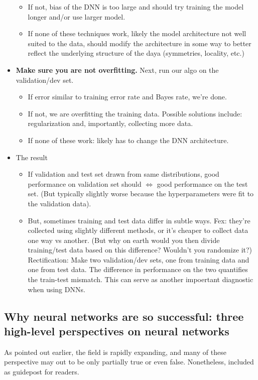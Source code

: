 \documentclass[norsk,a4paper,11pt]{article}
\begin{document}
\begin{itemize}
\begin{itemize}
		\item If not, bias of the DNN is too large and should try training the model longer and/or use larger model.
		\item If none of these techniques work, likely the model architecture not well suited to the data, should modify the architecture in some way to better reflect the underlying structure of the daya (symmetries, locality, etc.)
	\end{itemize}
	\item \textbf{Make sure you are not overfitting.}
	Next, run our algo on the validation/dev set.
	\begin{itemize}
		\item If error similar to training error rate and Bayes rate, we're done.
		\item If not, we are overfitting the training data. Possible solutions include: regularization and, importantly, collecting more data.
		\item If none of these work: likely has to change the DNN architecture.
	\end{itemize}
	\item The result
	\begin{itemize}
		\item If validation and test set drawn from same distributions, good performance on validation set should $\Leftrightarrow$  good performance on the test set. (But typically slightly worse because the hyperparameters were fit to the validation data). 
		\item But, sometimes training and test data differ in subtle ways. Fex: they're collected using slightly different methods, or it's cheaper to collect data one way vs another. (But why on earth would you then divide training/test data based on this difference? Wouldn't you randomize it?) Rectification: Make two validation/dev sets, one from training data and one from test data. The difference in performance on the two quantifies the train-test mismatch. This can serve as another impoertant diagnostic when using DNNs.
	\end{itemize}
\end{itemize}

\subsection{Why neural networks are so successful: three high-level perspectives on neural networks}
As pointed out earlier, the field is rapidly expanding, and many of these perspective may out to be only partially true or even false. Nonetheless, included as guidepost for readers.
\end{document}
